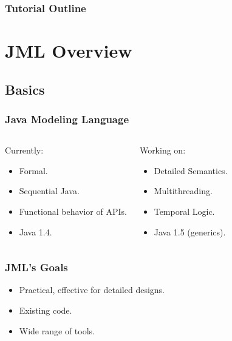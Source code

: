 \begin{frame}
\frametitle{Tutorial Outline}
  \tableofcontents[hideallsubsections] %
\end{frame}


\section[Overview]{JML Overview}

\subsection[Basics]{Basics}

\begin{frame}
\frametitle{Java Modeling Language}
\begin{columns}[t]
\begin{block}{Currently:}
\begin{itemize}
\item
Formal.

\item 
Sequential Java.

\item
Functional behavior of APIs.

\item
Java 1.4.
\end{itemize}
\end{block}

\pause

\begin{block}{Working on:}
\begin{itemize}
\item
Detailed Semantics.

\item 
Multithreading.

\item
Temporal Logic.

\item
Java 1.5 (generics).
\end{itemize}
\end{block}
\end{columns}
\end{frame}

\begin{frame}
\frametitle{JML's Goals}
\begin{itemize}
\item
Practical, effective for detailed designs.

\item
Existing code.

\item
Wide range of tools.
\end{itemize}
\end{frame}

